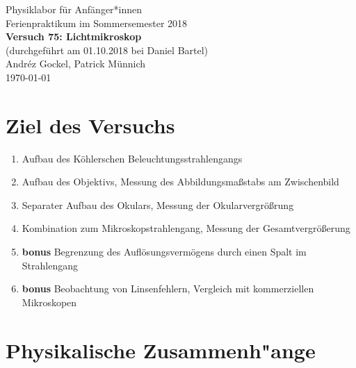 \documentclass[11pt,a4paper]{article}
\begin{document}
{
\centering 
\large 
Physiklabor für Anf\"anger*innen \\
Ferienpraktikum im Sommersemester 2018 \\[4mm]
\textbf{\LARGE 
Versuch 75: Lichtmikroskop
} \\[3mm]
(durchgef\"uhrt am 01.10.2018 bei Daniel Bartel) \\
Andréz Gockel, Patrick M\"unnich\\
\today \\[10mm]
}

\vspace{50pt}
\tableofcontents
\vspace{22pt}
\listoftables
\vspace{22pt}
\listoffigures
\pagebreak

\section{Ziel des Versuchs}

\begin{enumerate}
\item Aufbau des Köhlerschen Beleuchtungsstrahlengangs
\item Aufbau des Objektivs, Messung des Abbildungsma\ss stabs am Zwischenbild
\item Separater Aufbau des Okulars, Messung der Okularvergr\"o\ss rung
\item Kombination zum Mikroskopstrahlengang, Messung der Gesamtvergr\"o\ss erung 
\item \textbf{bonus} Begrenzung des Aufl\"osungsverm\"ogens durch einen Spalt im Strahlengang 
\item \textbf{bonus} Beobachtung von Linsenfehlern, Vergleich mit kommerziellen Mikroskopen
\end{enumerate}


\section{Physikalische Zusammenh"ange}
\end{document}
